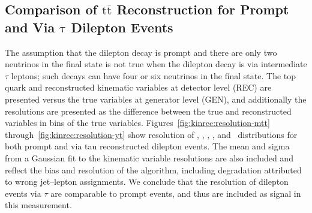 \subsection{Comparison of \ensuremath{\mathrm{t\bar{t}}} Reconstruction for Prompt and Via \ensuremath{\mathrm{\tau}} Dilepton Events}
The assumption that the dilepton decay is prompt and there are only two neutrinos in the final state is not true when the dilepton decay is via intermediate $\tau$ leptons; such decays can have four or six neutrinos in the final state.
The top quark and \ttbar reconstructed kinematic variables at detector level (REC) are presented versus the true variables at generator level (GEN), and additionally the resolutions are presented as the difference between the true and reconstructed variables in bins of the true variables. 
Figures~\ref{fig:kinrec:resolution-mtt} through~\ref{fig:kinrec:resolution-yt} show resolution of \mtt, \ytt, \pttt, \yt, and \ptt\ distributions for both prompt and via tau reconstructed \ttbar dilepton events. 
The mean and sigma from a Gaussian fit to the kinematic variable resolutions are also included and reflect the bias and resolution of the algorithm, including degradation attributed to wrong jet--lepton assignments. 
We conclude that the resolution of \ttbar dilepton events via $\tau$ are comparable to prompt events, and thus are included as signal in this measurement.

